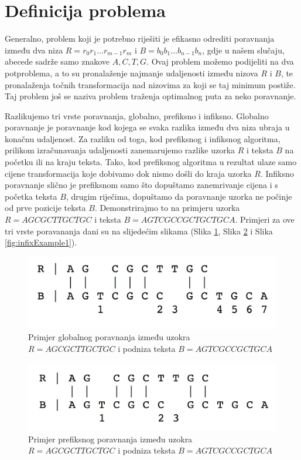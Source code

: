 \documentclass[times, utf8, zavrsni]{fer}
\begin{document}
\section{Definicija problema}
Generalno, problem koji je potrebno riješiti je efikasno odrediti poravnanja između dva niza \(R = r_{0}r_{1}{\dots}r_{m-1}r_{m}\) i \(B = b_{0}b_{1}{\dots}b_{n-1}b_{n}\), gdje u našem slučaju, abecede sadrže samo znakove $A,C,T,G$. Ovaj problem možemo podijeliti na dva potproblema, a to su pronalaženje najmanje udaljenosti između nizova $R$ i $B$, te pronalaženja točnih transformacija nad nizovima za koji se taj minimum postiže. Taj problem još se naziva problem traženja optimalnog puta za neko poravnanje. 

Razlikujemo tri vrste poravnanja, globalno, prefiksno i infiksno. Globalno poravnanje je poravnanje kod kojega se svaka razlika između dva niza ubraja u konačnu udaljenost. Za razliku od toga, kod prefiksnog i infiksnog algoritma, prilikom izračunavanja udaljenosti zanemarujemo razlike uzorka $R$ i teksta $B$ na početku ili na kraju teksta. Tako, kod prefiksnog algoritma u rezultat ulaze samo cijene transformacija koje dobivamo dok nismo došli do kraja uzorka $R$. Infiksno poravnanje slično je prefiksnom samo što dopuštamo zanemrivanje cijena i s početka teksta $B$, drugim riječima, dopuštamo da poravnanje uzorka ne počinje od prve pozicije teksta $B$. Demonstrirajmo to na primjeru uzorka $R = AGCGCTTGCTGC$ i teksta $B = AGTCGCCGCTGCTGCA$. Primjeri za ove tri vrste poravananja dani su na slijedećim slikama (Slika \ref{fig:globalExample}, Slika \ref{fig:prefixExample} i Slika \ref{fig:infixExample1}).

\begin{figure}[ht!]
\centering
\includegraphics[width=120mm]{global_example.jpeg}
\caption{Primjer globalnog poravnanja između uzokra $R = AGCGCTTGCTGC$ i podniza teksta $B = AGTCGCCGCTGCA $}\label{fig:globalExample}
\end{figure}

\begin{figure}[ht!]
\centering
\includegraphics[width=120mm]{prefix_example.jpeg}
\caption{Primjer prefiksnog poravnanja između uzokra $R = AGCGCTTGCTGC$ i podniza teksta $B = AGTCGCCGCTGCA $}\label{fig:prefixExample}
\end{figure}
\end{document}
